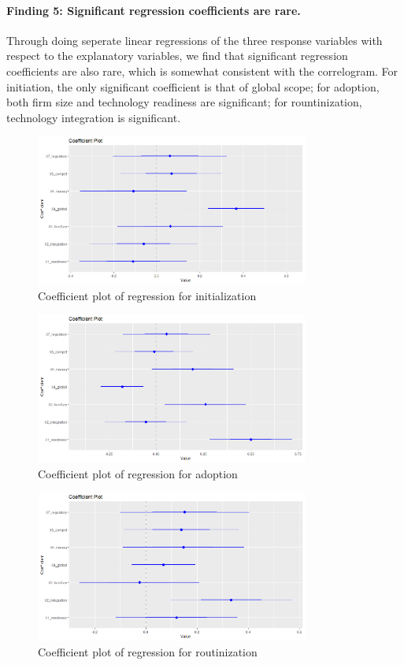 \documentclass[12pt, letterpaper]{article}
\begin{document}
\paragraph{Finding 5: Significant regression coefficients are rare.} 
Through doing seperate linear regressions of the three response variables with respect to the explanatory variables,  we find that significant regression coefficients are also rare, which is somewhat consistent with the correlogram. For initiation, the only significant coefficient is that of global scope; for adoption, both firm size and technology readiness are significant; for rountinization, technology integration is significant.
\begin{figure}[H]
\centering
\includegraphics[width=0.8\textwidth]{coef_init}
\caption{Coefficient plot of regression for initialization}
\end{figure}
\begin{figure}[H]
\centering
\includegraphics[width=0.8\textwidth]{coef_adopt}
\caption{Coefficient plot of regression for adoption}
\end{figure}
\begin{figure}[H]
\centering
\includegraphics[width=0.8\textwidth]{coef_rout}
\caption{Coefficient plot of regression for  routinization}
\end{figure}
\end{document}
